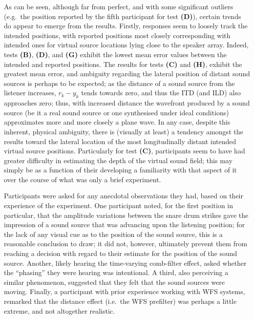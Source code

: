 As can be seen, although far from perfect, and with some significant
outliers (e.g.\ the position reported by the fifth participant for test
\textbf{(D)}), certain trends do appear to emerge from the results.
Firstly, responses seem to loosely track the intended positions, with reported
positions most closely corresponding with intended ones for virtual source
locations lying close to the speaker array.
Indeed, tests \textbf{(B)}, \textbf{(D)}, and \textbf{(G)} exhibit the lowest
mean error values between the intended and reported positions.
The results for tests \textbf{(C)} and \textbf{(H)}, exhibit the greatest mean
error, and ambiguity regarding the lateral position of distant sound sources is
perhaps to be expected;
as the distance of a sound source from the listener increases, $r_k - y_k$
tends towards zero, and thus the ITD (and ILD) also approaches zero;
thus, with increased distance the wavefront produced by a sound source (be it a
real sound source or one synthesised under ideal conditions) approximates more
and more closely a plane wave.
In any case, despite this inherent, physical ambiguity, there is (visually
at least) a tendency amongst the results toward the lateral location of the
most longitudinally distant intended virtual source positions.
Particularly for test \textbf{(C)}, participants seem to have had greater
difficulty in estimating the depth of the virtual sound field; this may simply
be as a function of their developing a familiarity with that aspect of it over
the course of what was only a brief experiment.

Participants were asked for any anecdotal observations they had, based on their
experience of the experiment.
One participant noted, for the first position in particular, that the amplitude
variations between the snare drum strikes gave the impression of a sound source
that was advancing upon the listening position; for the lack of any visual cue
as to the position of the sound source, this is a reasonable conclusion to draw;
it did not, however, ultimately prevent them from reaching a decision with
regard to their estimate for the position of the sound source.
Another, likely hearing the time-varying comb-filter effect, asked whether the
``phasing'' they were hearing was intentional.
A third, also perceiving a similar phenomenon, suggested that they
felt that the sound sources were moving.
Finally, a participant with prior experience working with WFS systems, remarked
that the distance effect (i.e.\ the WFS prefilter) was perhaps a little extreme,
and not altogether realistic.

